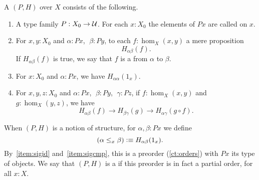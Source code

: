 \documentclass[hott-all.tex]{subfiles}
\begin{document}
%
%

\begin{defn}\label{ct:sig}
  A 
  $(P,H)$ over $X$ consists of the following.
  \begin{enumerate}
  \item A type family $P:X_0 \to \mathcal{U}$.
    For each $x:X_0$ the elements of $Px$ are called 
    on $x$.
  \item For $x,y:X_0$ and $\alpha:Px$, $\;\beta:Py$, to each $f:\hom_X(x,y)$ a mere proposition
  \[ H_{\alpha\beta}(f).\]
    If $H_{\alpha\beta}(f)$ is true, we say that $f$ is a 
    from $\alpha$ to $\beta$.
  \item For $x:X_0$ and $\alpha:Px$, we have $H_{\alpha\alpha}(1_x)$.\label{item:sigid}
  \item For $x,y,z:X_0$ and $\alpha:Px$, $\;\beta:Py$, $\;\gamma:Pz$,
if $f:\hom_X(x,y)$ and $g:\hom_X(y,z)$, we have\label{item:sigcmp}
  \[ H_{\alpha\beta}(f)\to H_{\beta\gamma}(g)\to H_{\alpha\gamma}(g\circ   f).\]
   \end{enumerate}
  When $(P,H)$ is a notion of structure, for $\alpha,\beta:Px$ we define
  \[ (\alpha\leq_x\beta) \vcentcolon\equiv H_{\alpha\beta}(1_x).\]
  By~\ref{item:sigid} and~\ref{item:sigcmp}, this is a preorder (\cref{ct:orders}) with $Px$ its type of objects.
  We say that $(P,H)$ is a 
  if this preorder is in fact a partial order, for all $x:X$.
\end{defn}
\end{document}
